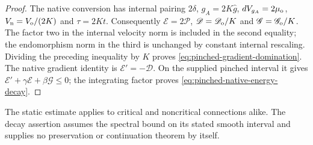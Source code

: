 \documentclass[11pt]{article}
\numberwithin{equation}{section}
\theoremstyle{definition}
\theoremstyle{remark}
\begin{document}
\begin{proof}
The native conversion has internal pairing $2\delta$,
$g_A=2K\widehat g$, $dV_{g_A}=2\mu_{\rm o}$,
$V_{\rm n}=V_{\rm o}/(2K)$ and $\tau=2Kt$.
Consequently $\mathscr E=2\mathcal P$,
$\mathscr D=\mathscr D_{\rm o}/K$ and
$\mathscr G=\mathscr G_{\rm o}/K$. The factor two in the
internal velocity norm is included in the second equality;
the endomorphism norm in the third is unchanged by constant
internal rescaling. Dividing the preceding inequality by
$K$ proves \eqref{eq:pinched-gradient-domination}.
The native gradient identity is $\mathscr E'=-\mathscr D$.
On the supplied pinched interval it gives
$\mathscr E'+\gamma\mathscr E+\beta\mathscr G\le0$;
the integrating factor proves \eqref{eq:pinched-native-energy-decay}.
\end{proof}

The static estimate applies to critical and noncritical
connections alike. The decay assertion assumes the spectral
bound on its stated smooth interval and supplies no
preservation or continuation theorem by itself.
\end{document}

